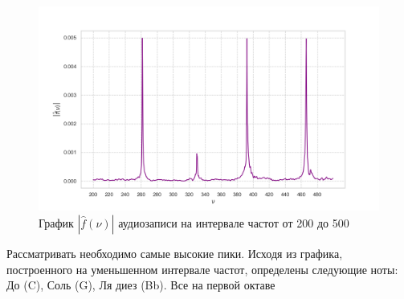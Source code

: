 \documentclass[a4paper, 16pt]{article}
\begin{document}
    \begin{figure}[!htb]
        \centering
        \includegraphics[scale=0.5]{f_v_reduced_200_to_500.png}
        \captionsetup{skip=0pt}
        \caption{График $|\hat{f}(\nu)|$ аудиозаписи на интервале частот от 200 до 500}
        \label{Рис:18}
    \end{figure}


    \noindent Рассматривать необходимо самые высокие пики. Исходя из графика,
    построенного на уменьшенном интервале частот, определены следующие ноты:
    До (C), Соль (G), Ля диез (Bb). Все на первой октаве
\end{document}
